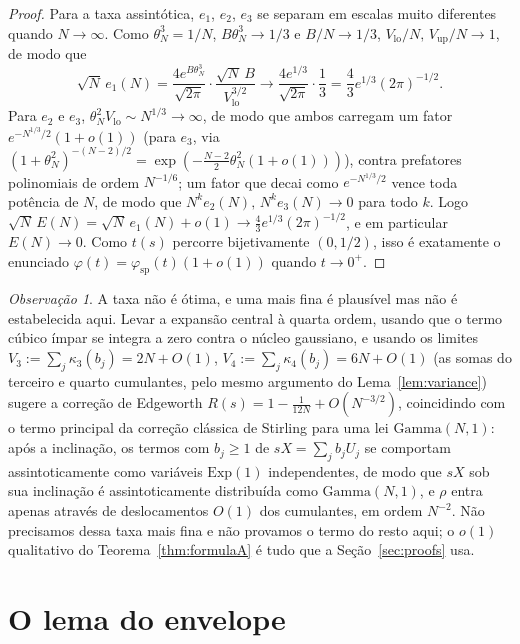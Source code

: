 \documentclass[11pt]{amsart}
\theoremstyle{plain}
\theoremstyle{definition}
\theoremstyle{remark}
\newtheorem{remark}[theorem]{Observação}
\begin{document}
\begin{proof}
Para a taxa assintótica, $e_1$, $e_2$, $e_3$ se separam em escalas muito diferentes quando
$N\to\infty$. Como $\theta_N^3=1/N$, $B\theta_N^3\to1/3$ e $B/N\to1/3$,
$V_{\mathrm{lo}}/N,\,V_{\mathrm{up}}/N \to1$, de modo que
\[
\sqrt N\,e_1(N) = \frac{4e^{B\theta_N^3}}{\sqrt{2\pi}}\cdot\frac{\sqrt N\,B}{V_{\mathrm{lo}}^{3/2}}
\longrightarrow \frac{4e^{1/3}}{\sqrt{2\pi}}\cdot\frac13 = \frac43e^{1/3}(2\pi)^{-1/2}.
\]
Para $e_2$ e $e_3$, $\theta_N^2V_{\mathrm{lo}} \sim N^{1/3}\to\infty$, de modo que ambos carregam um
fator $e^{-N^{1/3}/2}(1+o(1))$ (para $e_3$, via $(1+\theta_N^2)^{-(N-2)/2} =
\exp(-\tfrac{N-2}2\theta_N^2(1+o(1)))$), contra prefatores polinomiais de ordem $N^{-1/6}$; um fator
que decai como $e^{-N^{1/3}/2}$ vence toda potência de $N$, de modo que $N^k e_2(N),\,N^k
e_3(N)\to0$ para todo $k$. Logo $\sqrt N\,E(N) = \sqrt N\,e_1(N) + o(1) \to
\tfrac43e^{1/3}(2\pi)^{-1/2}$, e em particular $E(N)\to0$. Como $t(s)$ percorre bijetivamente
$(0,1/2)$, isso é exatamente o enunciado $\varphi(t)=\varphi_{\mathrm{sp}}(t)(1+o(1))$ quando
$t\to0^+$.
\end{proof}

\begin{remark}
\label{rem:edgeworth}
A taxa não é ótima, e uma mais fina é plausível mas não é estabelecida aqui. Levar a expansão
central à quarta ordem, usando que o termo cúbico ímpar se integra a zero contra o núcleo
gaussiano, e usando os limites $V_3 := \sum_j\kappa_3(b_j) = 2N+O(1)$, $V_4 :=
\sum_j\kappa_4(b_j) = 6N+O(1)$ (as somas do terceiro e quarto cumulantes, pelo mesmo argumento do
Lema~\ref{lem:variance}) sugere a correção de Edgeworth $R(s) = 1 - \tfrac1{12N} + O(N^{-3/2})$,
coincidindo com o termo principal da correção clássica de Stirling para uma lei
$\mathrm{Gamma}(N,1)$: após a inclinação, os termos com $b_j\ge1$ de $sX=\sum_jb_jU_j$ se comportam
assintoticamente como variáveis $\mathrm{Exp}(1)$ independentes, de modo que $sX$ sob sua inclinação
é assintoticamente distribuída como $\mathrm{Gamma}(N,1)$, e $\rho$ entra apenas através de
deslocamentos $O(1)$ dos cumulantes, em ordem $N^{-2}$. Não precisamos dessa taxa mais fina e não
provamos o termo do resto aqui; o $o(1)$ qualitativo do Teorema~\ref{thm:formulaA} é tudo que a
Seção~\ref{sec:proofs} usa.
\end{remark}

\section{O lema do envelope}
\label{sec:envelope}
\end{document}
